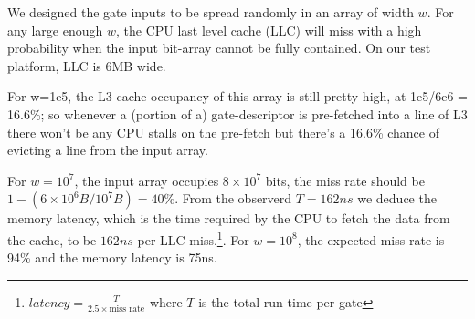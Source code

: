 \par
We designed the gate inputs to be spread randomly in an array of width $w$. For any large enough $w$, the CPU last level cache (LLC) will miss with a high probability when the input bit-array cannot be fully contained. On our test platform, LLC is 6MB wide.
\par
For w=1e5, the L3 cache occupancy of this array is still pretty high, at 1e5/6e6 = 16.6\%; so whenever a (portion of a) gate-descriptor is pre-fetched into a line of L3 there won't be any CPU stalls on the pre-fetch but there's a 16.6\% chance of evicting a line from the input array.
\par
For $w = 10^7$, the input array occupies $8 \times 10^7$ bits, the miss rate should be $1 - (6\times10^6B/10^7B) = 40\%$. From the observerd $T = 162ns$ we deduce the memory latency, which is the time required by the CPU to fetch the data from the cache, to be $162ns$ per LLC miss.\footnote{ $latency = \frac{T}{2.5 \times \text{miss rate}}$ where $T$ is the total run time per gate}. For $w = 10^8$, the expected miss rate is 94\% and the memory latency is 75ns. 




